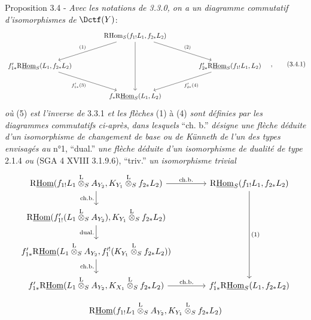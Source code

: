 \begin{statement}{Proposition 3.4 -}
\emph{Avec les notations de 3.3.0, on a un diagramme commutatif d'isomorphismes de} $\Dctf(Y)$:
\begin{equation}
\begin{tikzcd}[column sep=4.0em,row sep=2.8em]
& \mathrm{R}\mathrm{Hom}_S(f_{1!}L_1,f_{2*}L_2)
  \arrow[dl,"(1)"'] \arrow[dr,"(2)"] \arrow[dd] & \\
f'_{1*}\mathrm{R}\underline{\mathrm{Hom}}_S(L_1,f_{2*}L_2) \arrow[dr,"f'_{1*}(3)"'] &&
f'_{2*}\mathrm{R}\underline{\mathrm{Hom}}_S(f_{1!}L_1,L_2) \arrow[dl,"f'_{2*}(4)"] \\
& f_*\mathrm{R}\underline{\mathrm{Hom}}_S(L_1,L_2) &
\end{tikzcd}\quad ,
\tag{3.4.1}
\end{equation}
\emph{où} (5) \emph{est l'inverse de} 3.3.1 \emph{et les flèches} (1) à (4) \emph{sont définies par les diagrammes commutatifs ci-après}, \emph{dans lesquels} ``ch. b.'' \emph{désigne une flèche déduite} 
\emph{d'un}
\emph{isomorphisme de changement de base ou de Künneth de l'un des types envisagés au} n°1, ``dual.'' \emph{une flèche déduite d'un isomorphisme de dualité de type} 2.1.4 \emph{ou} (SGA 4 XVIII 3.1.9.6), ``triv.'' \emph{un isomorphisme trivial}
\[
\begin{tikzcd}[column sep=3.7em,row sep=1.7em]
\mathrm{R}\underline{\mathrm{Hom}}(f_{1!}L_1\overset{\mathrm{L}}{\otimes}_S A_{Y_2},K_{Y_1}\overset{\mathrm{L}}{\otimes}_S f_{2*}L_2)
  \arrow[r,"\mathrm{ch.b.}"] \arrow[d,"\mathrm{ch.b.}"']
& \mathrm{R}\underline{\mathrm{Hom}}_S(f_{1!}L_1,f_{2*}L_2) \arrow[ddd,"(1)"] \\
\mathrm{R}\underline{\mathrm{Hom}}(f'_{1!}(L_1\overset{\mathrm{L}}{\otimes}_S A_{Y_2}),K_{Y_1}\overset{\mathrm{L}}{\otimes}_S f_{2*}L_2) \arrow[d,"\mathrm{dual.}"']
& \\
f'_{1*}\mathrm{R}\underline{\mathrm{Hom}}(L_1\overset{\mathrm{L}}{\otimes}_S A_{Y_2},f_1'^!(K_{Y_1}\overset{\mathrm{L}}{\otimes}_S f_{2*}L_2)) \arrow[d,"\mathrm{ch.b.}"']
& \\
f'_{1*}\mathrm{R}\underline{\mathrm{Hom}}(L_1\overset{\mathrm{L}}{\otimes}_S A_{Y_2},K_{X_1}\overset{\mathrm{L}}{\otimes}_S f_{2*}L_2) \arrow[r,"\mathrm{ch.b.}"]
& f'_{1*}\mathrm{R}\underline{\mathrm{Hom}}_S(L_1,f_{2*}L_2)
\end{tikzcd}
\]
\[
\begin{tikzcd}[column sep=3.7em,row sep=1.7em]
\mathrm{R}\underline{\mathrm{Hom}}(f_{1!}L_1\overset{\mathrm{L}}{\otimes}_S A_{Y_2},K_{Y_1}\overset{\mathrm{L}}{\otimes}_S f_{2*}L_2)

\end{tikzcd}\]
\end{statement}

